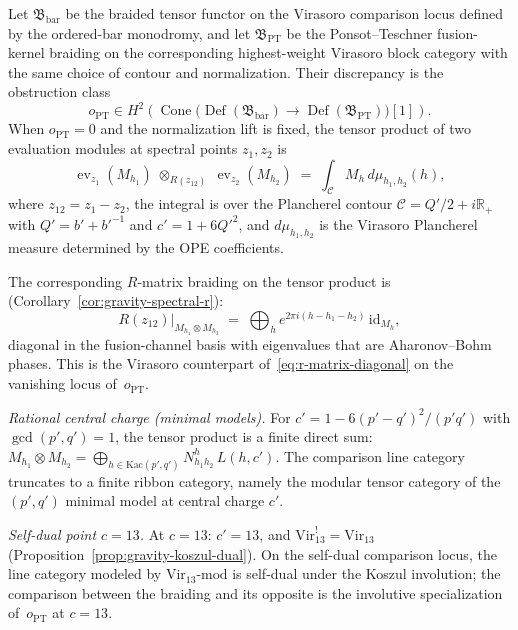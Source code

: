 \begin{proposition}
\label{comp:virasoro-eval-fusion}
Let $\mathfrak B_{\mathrm{bar}}$ be the braided tensor functor on the
Virasoro comparison locus defined by the ordered-bar monodromy, and
let $\mathfrak B_{\mathrm{PT}}$ be the Ponsot--Teschner fusion-kernel
braiding on the corresponding highest-weight Virasoro block category
with the same choice of contour and normalization. Their discrepancy
is the obstruction class
\[
 o_{\mathrm{PT}}
 \in
 H^2\!\left(
 \operatorname{Cone}\bigl(
 \operatorname{Def}(\mathfrak B_{\mathrm{bar}})
 \longrightarrow
 \operatorname{Def}(\mathfrak B_{\mathrm{PT}})
 \bigr)[1]\right).
\]
When $o_{\mathrm{PT}}=0$ and the normalization lift is fixed, the
tensor product of two evaluation modules at spectral points
$z_1,z_2$ is
\begin{equation}\label{eq:virasoro-fusion}
\operatorname{ev}_{z_1}(M_{h_1})
\;\otimes_{R(z_{12})}\;
\operatorname{ev}_{z_2}(M_{h_2})
\;=\;
\int_{\mathcal{C}} M_{h}\,
d\mu_{h_1,h_2}(h),
\end{equation}
where $z_{12} = z_1 - z_2$, the integral is over the
Plancherel contour $\mathcal{C} = Q'/2 + i\mathbb{R}_+$
with $Q' = b' + b'^{-1}$ and $c' = 1 + 6Q'^2$,
and $d\mu_{h_1,h_2}$ is the Virasoro Plancherel measure
determined by the OPE coefficients.

The corresponding $R$-matrix braiding on the tensor product is
(Corollary~\ref{cor:gravity-spectral-r}):
\begin{equation}\label{eq:virasoro-braiding-eval}
R(z_{12})\big|_{M_{h_1} \otimes M_{h_2}}
\;=\;
\bigoplus_{h}
e^{2\pi i(h - h_1 - h_2)}\,
\mathrm{id}_{M_h},
\end{equation}
diagonal in the fusion-channel basis with eigenvalues
that are Aharonov--Bohm phases. This is the Virasoro
counterpart of~\eqref{eq:r-matrix-diagonal} on the vanishing locus
of~$o_{\mathrm{PT}}$.

\emph{Rational central charge (minimal models).}\enspace
For $c' = 1 - 6(p'-q')^2/(p'q')$ with
$\gcd(p',q') = 1$, the tensor product is a finite direct
sum: $M_{h_1} \otimes M_{h_2} = \bigoplus_{h \in
\mathrm{Kac}(p',q')} N^{h}_{h_1 h_2}\, L(h, c')$.
The comparison line category truncates to a finite ribbon
category, namely the modular tensor category of the
$(p',q')$ minimal model at central charge $c'$.

\emph{Self-dual point $c = 13$.}\enspace
At $c = 13$: $c' = 13$, and
$\mathrm{Vir}_{13}^! = \mathrm{Vir}_{13}$
(Proposition~\ref{prop:gravity-koszul-dual}).
On the self-dual comparison locus, the line category modeled by
$\mathrm{Vir}_{13}\text{-mod}$ is self-dual under
the Koszul involution; the comparison between the braiding and its
opposite is the involutive specialization of~$o_{\mathrm{PT}}$ at
$c=13$.
\end{proposition}

